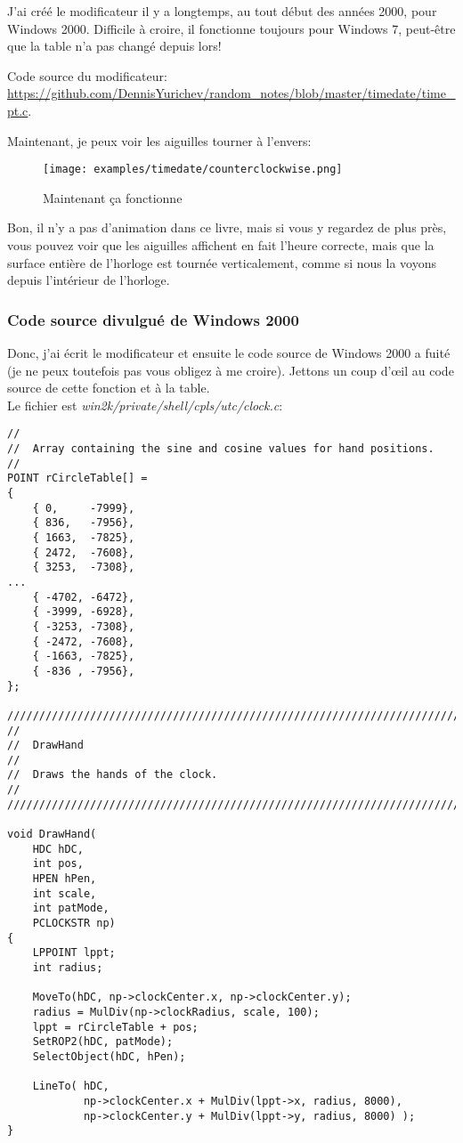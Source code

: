 J'ai créé le modificateur il y a longtemps, au tout début des années 2000, pour Windows 2000.
Difficile à croire, il fonctionne toujours pour Windows 7, peut-être que la table
n'a pas changé depuis lors!

Code source du modificateur: \url{https://github.com/DennisYurichev/random_notes/blob/master/timedate/time_pt.c}.

Maintenant, je peux voir les aiguilles tourner à l'envers:

\begin{figure}[H]
\centering
\texttt{[image: examples/timedate/counterclockwise.png]}
\caption{Maintenant ça fonctionne}
\end{figure}

Bon, il n'y a pas d'animation dans ce livre, mais si vous y regardez de plus près,
vous pouvez voir que les aiguilles affichent en fait l'heure correcte, mais que la
surface entière de l'horloge est tournée verticalement, comme si nous la voyons depuis
l'intérieur de l'horloge.

\subsubsection{Code source divulgué de Windows 2000}

Donc, j'ai écrit le modificateur et ensuite le code source de Windows 2000 a fuité
(je ne peux toutefois pas vous obligez à me croire).
Jettons un coup d'\oe{}il au code source de cette fonction et à la table.\\
Le fichier est \emph{win2k/private/shell/cpls/utc/clock.c}:

\begin{lstlisting}[style=customc]
//
//  Array containing the sine and cosine values for hand positions.
//
POINT rCircleTable[] =
{
    { 0,     -7999},
    { 836,   -7956},
    { 1663,  -7825},
    { 2472,  -7608},
    { 3253,  -7308},
...
    { -4702, -6472},
    { -3999, -6928},
    { -3253, -7308},
    { -2472, -7608},
    { -1663, -7825},
    { -836 , -7956},
};

////////////////////////////////////////////////////////////////////////////
//
//  DrawHand
//
//  Draws the hands of the clock.
//
////////////////////////////////////////////////////////////////////////////

void DrawHand(
    HDC hDC,
    int pos,
    HPEN hPen,
    int scale,
    int patMode,
    PCLOCKSTR np)
{
    LPPOINT lppt;
    int radius;

    MoveTo(hDC, np->clockCenter.x, np->clockCenter.y);
    radius = MulDiv(np->clockRadius, scale, 100);
    lppt = rCircleTable + pos;
    SetROP2(hDC, patMode);
    SelectObject(hDC, hPen);

    LineTo( hDC,
            np->clockCenter.x + MulDiv(lppt->x, radius, 8000),
            np->clockCenter.y + MulDiv(lppt->y, radius, 8000) );
}
\end{lstlisting}


